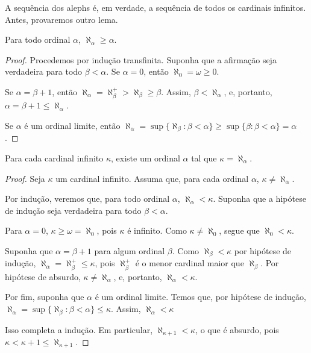 A sequência dos alephs é, em verdade, a sequência de todos os cardinais infinitos.
Antes, provaremos outro lema.

\begin{lemma}\label{lem:alephAlphaMaiorIgualAlpha}
    Para todo ordinal $\alpha$, $\aleph_\alpha\geq \alpha$.
\end{lemma}
\begin{proof}
Procedemos por indução transfinita.
Suponha que a afirmação seja verdadeira para todo $\beta<\alpha$.
Se $\alpha=0$, então $\aleph_0 = \omega \geq 0$.

Se $\alpha = \beta + 1$, então $\aleph_\alpha = \aleph_\beta^+>\aleph_\beta \geq \beta$.
Assim, $\beta<\aleph_{\alpha}$, e, portanto, $\alpha=\beta+1 \leq \aleph_\alpha$.

Se $\alpha$ é um ordinal limite, então $\aleph_\alpha = \sup\{\aleph_\beta : \beta < \alpha\}\geq \sup\{\beta : \beta < \alpha\} = \alpha$.
\end{proof}
\begin{theorem}\label{thm:todoCardinalInfinitoEhAleph}
    Para cada cardinal infinito $\kappa$, existe um ordinal $\alpha$ tal que $\kappa = \aleph_\alpha$.
\end{theorem}
\begin{proof}
    Seja $\kappa$ um cardinal infinito.
    Assuma que, para cada ordinal $\alpha$, $\kappa \neq \aleph_\alpha$.

    Por indução, veremos que, para todo ordinal $\alpha$, $\aleph_\alpha<\kappa$.
    Suponha que a hipótese de indução seja verdadeira para todo $\beta<\alpha$.

    Para $\alpha=0$, $\kappa \geq \omega = \aleph_0$, pois $\kappa$ é infinito.
    Como $\kappa \neq \aleph_0$, segue que $\aleph_0<\kappa$.

    Suponha que $\alpha = \beta + 1$ para algum ordinal $\beta$.
    Como $\aleph_\beta < \kappa$ por hipótese de indução, $\aleph_\alpha=\aleph_\beta^+ \leq \kappa$, pois $\aleph_\beta^+$ é o menor cardinal maior que $\aleph_\beta$.
    Por hipótese de absurdo, $\kappa \neq \aleph_\alpha$, e, portanto, $\aleph_\alpha < \kappa$.

    Por fim, suponha que $\alpha$ é um ordinal limite.
    Temos que, por hipótese de indução, $\aleph_\alpha=\sup\{\aleph_\beta : \beta < \alpha\} \leq \kappa$.
    Assim, $\aleph_\alpha < \kappa$

    Isso completa a indução.
    Em particular, $\aleph_{\kappa+1} < \kappa$, o que é absurdo, pois $\kappa <\kappa+1\leq \aleph_{\kappa+1}$.
\end{proof}

